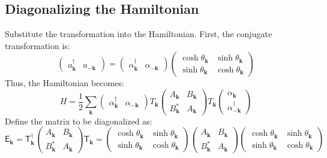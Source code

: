 \subsection*{Diagonalizing the Hamiltonian}

Substitute the transformation into the Hamiltonian. First, the conjugate transformation is:
\begin{equation}
    \begin{pmatrix}
        a^{\dagger}_{\mathbf{k}} & a_{-\mathbf{k}}
    \end{pmatrix}
    =
    \begin{pmatrix}
        \alpha^{\dagger}_{\mathbf{k}} & \alpha_{-\mathbf{k}}
    \end{pmatrix}
    \begin{pmatrix}
        \cosh \theta_{\mathbf{k}} & \sinh \theta_{\mathbf{k}} \\
        \sinh \theta_{\mathbf{k}} & \cosh \theta_{\mathbf{k}}
    \end{pmatrix}
\end{equation}
Thus, the Hamiltonian becomes:
\begin{equation}
    H = \frac{1}{2} \sum_{\mathbf{k}}
    \begin{pmatrix}
        \alpha^{\dagger}_{\mathbf{k}} & \alpha_{-\mathbf{k}}
    \end{pmatrix}
    T_{\mathbf{k}}
    \begin{pmatrix}
        A_{\mathbf{k}} & B_{\mathbf{k}} \\
        B_{\mathbf{k}}^{*} & A_{\mathbf{k}}
    \end{pmatrix}
    T_{\mathbf{k}}
    \begin{pmatrix}
        \alpha_{\mathbf{k}} \\
        \alpha^{\dagger}_{-\mathbf{k}}
    \end{pmatrix}
\end{equation}
Define the matrix to be diagonalized as:
\begin{equation}
    \mathsf{E}_{\mathbf{k}} = \mathsf{T}_{\mathbf{k}}^{\dagger}
    \begin{pmatrix}
        A_{\mathbf{k}} & B_{\mathbf{k}} \\
        B_{\mathbf{k}}^{*} & A_{\mathbf{k}}
    \end{pmatrix}
    \mathsf{T}_{\mathbf{k}}
    =
    \begin{pmatrix}
        \cosh \theta_{\mathbf{k}} & \sinh \theta_{\mathbf{k}} \\
        \sinh \theta_{\mathbf{k}} & \cosh \theta_{\mathbf{k}}
    \end{pmatrix}
    \begin{pmatrix}
        A_{\mathbf{k}} & B_{\mathbf{k}} \\
        B_{\mathbf{k}}^{*} & A_{\mathbf{k}}
    \end{pmatrix}
    \begin{pmatrix}
        \cosh \theta_{\mathbf{k}} & \sinh \theta_{\mathbf{k}} \\
        \sinh \theta_{\mathbf{k}} & \cosh \theta_{\mathbf{k}}
    \end{pmatrix}
\end{equation}
